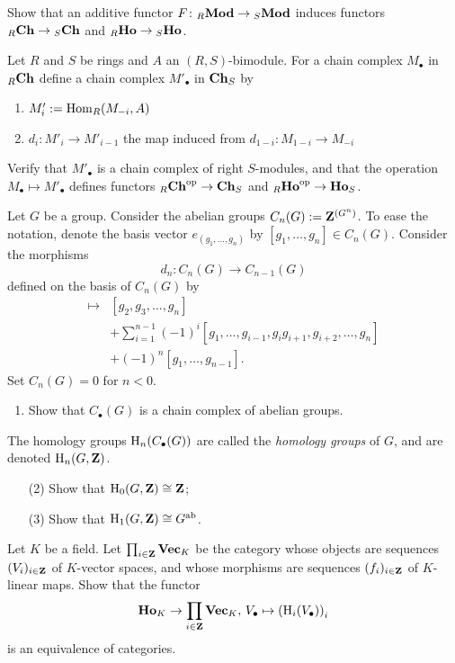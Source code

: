 \begin{exercise}
Show that an additive functor $F\colon {}_R\mathbf{Mod} \to {}_S\mathbf{Mod}$ induces functors
${}_R\mathbf{Ch}\to {}_S\mathbf{Ch}$ and ${}_R\mathbf{Ho}\to {}_S\mathbf{Ho}$.
\end{exercise}

\begin{exercise}\label{exc:contravariant-hom-on-chain-complexes}
Let $R$ and $S$ be rings and $A$ an $(R,S)$-bimodule. For a chain complex $M_\bullet$ in ${}_R\mathbf{Ch}$ define a chain complex $M'_\bullet$ in $\mathbf{Ch}_S$
by
\begin{enumerate}
\item $M'_i := \operatorname{Hom}_R(M_{-i},A)$ 
\item $d_i\colon M'_i \to M'_{i-1}$ the map induced from $d_{1-i} \colon M_{1-i} \to M_{-i}$
\end{enumerate}
Verify that $M'_\bullet$ is a chain complex of right $S$-modules, and that the operation $M_\bullet \mapsto M'_\bullet$ defines functors ${}_R\mathbf{Ch}^{\mathrm{op}} \to \mathbf{Ch}_S$ and ${}_R\mathbf{Ho}^{\mathrm{op}} \to \mathbf{Ho}_S$.
\end{exercise}

\begin{exercise}[$\star$]
Let $G$ be a group. Consider the abelian groups $C_n(G) := {\mathbf{Z}}^{(G^n)}$. To ease the notation, denote the basis vector $e_{(g_1,\ldots,g_n)}$ by $[g_1,\ldots,g_n] \in C_n(G)$. Consider the morphisms
\[
	d_n \colon C_n(G) \to C_{n-1}(G) 
\]
defined on the basis of $C_n(G)$ by
\begin{align*}
	[g_1,\ldots, g_n] \mapsto &[g_2, g_3, \ldots, g_n] \\
	&+ \sum_{i=1}^{n-1} (-1)^i [g_1,\ldots, g_{i-1}, g_i g_{i+1}, g_{i+2}, \ldots, g_n] \\
	& + (-1)^n [ g_1,\ldots, g_{n-1} ].
\end{align*}
Set $C_n(G)=0$ for $n<0$.
\begin{enumerate}
\item Show that $C_\bullet(G)$ is a chain complex of abelian groups.
\end{enumerate}
The homology groups
${\mathrm H}_n(C_\bullet(G))$ are called the \emph{homology groups} of $G$, and are denoted ${\mathrm H}_n(G,{\mathbf{Z}})$.
\begin{enumerate}
\item[(2)] Show that ${\mathrm H}_0(G,{\mathbf{Z}})\cong {\mathbf{Z}}$;
\item[(3)] Show that ${\mathrm H}_1(G,{\mathbf{Z}})\cong G^{\mathrm{ab}}$.
\end{enumerate} 
\end{exercise}


\begin{exercise}[$\star$]
Let $K$ be a field. Let $\prod_{i\in {\mathbf{Z}}} \operatorname{{\bf{Vec}}}_K$ be the category whose objects are sequences $(V_i)_{i\in {\mathbf{Z}}}$ of $K$-vector spaces, and whose morphisms are sequences $(f_i)_{i\in {\mathbf{Z}}}$ of $K$-linear maps. Show that the functor
\[
	\mathbf{Ho}_K \to \prod_{i\in {\mathbf{Z}}} \operatorname{{\bf{Vec}}}_K,\, V_\bullet \mapsto \left( {\mathrm H}_i(V_\bullet) \right)_{i}
\]
is an equivalence of categories.
\end{exercise}


